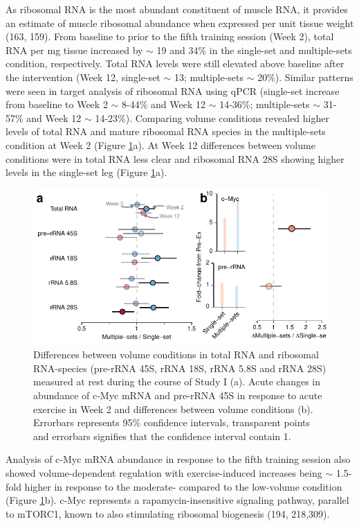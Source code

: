 \documentclass[twoside,10pt]{gihclass} %
\begin{document}
As ribosomal RNA is the most abundant constituent of muscle RNA, it provides an estimate of muscle ribosomal abundance when expressed per unit tissue weight
(163, 159).
From baseline to prior to the fifth training session (Week 2), total RNA per mg tissue increased by \(\sim\) 19 and 34\% in the single-set and multiple-sets condition, respectively. Total RNA levels were still elevated above baseline after the intervention (Week 12, single-set \(\sim\) 13; multiple-sets \(\sim\) 20\%). Similar patterns were seen in target analysis of ribosomal RNA using qPCR (single-set increase from baseline to Week 2 \(\sim\) 8-44\% and Week 12 \(\sim\) 14-36\%; multiple-sets \(\sim\) 31-57\% and Week 12 \(\sim\) 14-23\%). Comparing volume conditions revealed higher levels of total RNA and mature ribosomal RNA species in the multiple-sets condition at Week 2 (Figure \ref{fig:rrna-fig}a). At Week 12 differences between volume conditions were in total RNA less clear and ribosomal RNA 28S showing higher levels in the single-set leg (Figure \ref{fig:rrna-fig}a).
\begin{figure}

{\centering \includegraphics{thesis_files/figure-latex/rrna-fig-1} 

}

\caption[Differences between volume conditions total RNA and ribosomal RNA]{Differences between volume conditions in total RNA and ribosomal RNA-species (pre-rRNA 45S, rRNA 18S, rRNA 5.8S and rRNA 28S) measured at rest during the course of Study I (a). Acute changes in abundance of c-Myc mRNA and pre-rRNA 45S in response to acute exercise in Week 2 and differences between volume conditions (b). Errorbars represents 95\% confidence intervals, transparent points and errorbars signifies that the confidence interval contain 1.}\label{fig:rrna-fig}
\end{figure}
Analysis of c-Myc mRNA abundance in response to the fifth training session also showed volume-dependent regulation with exercise-induced increases being \(\sim\) 1.5-fold higher in response to the moderate- compared to the low-volume condition (Figure \ref{fig:rrna-fig}b). c-Myc represents a rapamycin-insensitive signaling pathway, parallel to mTORC1, known to also stimulating ribosomal biogenesis
(194, 218,309).
\end{document}

